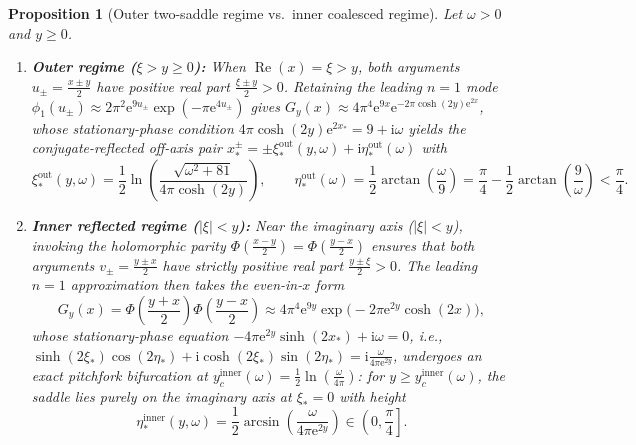 \documentclass[11pt,a4paper,reqno]{amsart}
\newtheorem{proposition}[theorem]{Proposition}
\theoremstyle{definition}
\theoremstyle{remark}
\numberwithin{equation}{section}
\newcommand{\ii}{\mathrm{i}}
\newcommand{\ee}{\mathrm{e}}
\newcommand{\Rea}{\operatorname{Re}}
\begin{document}
\begin{proposition}[Outer two-saddle regime vs.\ inner coalesced regime]\label{prop:two_regimes}
Let $\omega > 0$ and $y \ge 0$.
\begin{enumerate}
\item[\textup{(a)}] \textbf{Outer regime ($\xi > y \ge 0$):} When $\Rea(x) = \xi > y$, both arguments $u_\pm = \frac{x\pm y}{2}$ have positive real part $\frac{\xi\pm y}{2} > 0$. Retaining the leading $n=1$ mode $\phi_1(u_\pm) \approx 2\pi^2\ee^{9u_\pm}\exp(-\pi\ee^{4u_\pm})$ gives $G_y(x) \approx 4\pi^4\ee^{9x}\ee^{-2\pi\cosh(2y)\ee^{2x}}$, whose stationary-phase condition $4\pi\cosh(2y)\ee^{2x_*} = 9 + \ii\omega$ yields the conjugate-reflected off-axis pair $x_*^\pm = \pm\xi_*^{\mathrm{out}}(y,\omega) + \ii\eta_*^{\mathrm{out}}(\omega)$ with
\begin{equation}\label{eq:outer_saddle}
\xi_*^{\mathrm{out}}(y,\omega) = \frac{1}{2}\ln\!\left(\frac{\sqrt{\omega^2 + 81}}{4\pi\cosh(2y)}\right), \qquad \eta_*^{\mathrm{out}}(\omega) = \frac{1}{2}\arctan\!\left(\frac{\omega}{9}\right) = \frac{\pi}{4} - \frac{1}{2}\arctan\!\left(\frac{9}{\omega}\right) < \frac{\pi}{4}.
\end{equation}
\item[\textup{(b)}] \textbf{Inner reflected regime ($|\xi| < y$):} Near the imaginary axis ($|\xi| < y$), invoking the holomorphic parity $\Phi(\frac{x-y}{2}) = \Phi(\frac{y-x}{2})$ ensures that both arguments $v_\pm = \frac{y\pm x}{2}$ have strictly positive real part $\frac{y\pm\xi}{2} > 0$. The leading $n=1$ approximation then takes the even-in-$x$ form
\begin{equation}\label{eq:inner_G_approx}
G_y(x) = \Phi\!\left(\frac{y+x}{2}\right)\Phi\!\left(\frac{y-x}{2}\right) \approx 4\pi^4\ee^{9y}\exp\!\Big(-2\pi\ee^{2y}\cosh(2x)\Big),
\end{equation}
whose stationary-phase equation $-4\pi\ee^{2y}\sinh(2x_*) + \ii\omega = 0$, i.e., $\sinh(2\xi_*)\cos(2\eta_*) + \ii\cosh(2\xi_*)\sin(2\eta_*) = \ii\frac{\omega}{4\pi\ee^{2y}}$, undergoes an exact pitchfork bifurcation at $y_c^{\mathrm{inner}}(\omega) = \frac{1}{2}\ln(\frac{\omega}{4\pi})$: for $y \ge y_c^{\mathrm{inner}}(\omega)$, the saddle lies purely on the imaginary axis at $\xi_* = 0$ with height
\begin{equation}\label{eq:inner_saddle_height}
\eta_*^{\mathrm{inner}}(y,\omega) = \frac{1}{2}\arcsin\!\left(\frac{\omega}{4\pi\ee^{2y}}\right) \in \left(0, \frac{\pi}{4}\right].
\end{equation}
\end{enumerate}
\end{proposition}
\end{document}
